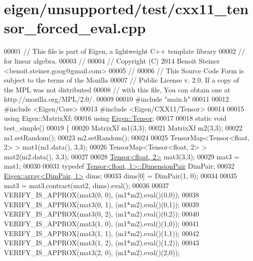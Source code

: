 \hypertarget{eigen_2unsupported_2test_2cxx11__tensor__forced__eval_8cpp_source}{}\section{eigen/unsupported/test/cxx11\+\_\+tensor\+\_\+forced\+\_\+eval.cpp}
\label{eigen_2unsupported_2test_2cxx11__tensor__forced__eval_8cpp_source}

\begin{DoxyCode}
00001 \textcolor{comment}{// This file is part of Eigen, a lightweight C++ template library}
00002 \textcolor{comment}{// for linear algebra.}
00003 \textcolor{comment}{//}
00004 \textcolor{comment}{// Copyright (C) 2014 Benoit Steiner <benoit.steiner.goog@gmail.com>}
00005 \textcolor{comment}{//}
00006 \textcolor{comment}{// This Source Code Form is subject to the terms of the Mozilla}
00007 \textcolor{comment}{// Public License v. 2.0. If a copy of the MPL was not distributed}
00008 \textcolor{comment}{// with this file, You can obtain one at http://mozilla.org/MPL/2.0/.}
00009 
00010 \textcolor{preprocessor}{#include "main.h"}
00011 
00012 \textcolor{preprocessor}{#include <Eigen/Core>}
00013 \textcolor{preprocessor}{#include <Eigen/CXX11/Tensor>}
00014 
00015 \textcolor{keyword}{using} Eigen::MatrixXf;
00016 \textcolor{keyword}{using} \hyperlink{class_eigen_1_1_tensor}{Eigen::Tensor};
00017 
00018 \textcolor{keyword}{static} \textcolor{keywordtype}{void} test\_simple()
00019 \{
00020   MatrixXf m1(3,3);
00021   MatrixXf m2(3,3);
00022   m1.setRandom();
00023   m2.setRandom();
00024 
00025   TensorMap<Tensor<float, 2> > mat1(m1.data(), 3,3);
00026   TensorMap<Tensor<float, 2> > mat2(m2.data(), 3,3);
00027 
00028   \hyperlink{class_eigen_1_1_tensor}{Tensor<float, 2>} mat3(3,3);
00029   mat3 = mat1;
00030 
00031   \textcolor{keyword}{typedef} \hyperlink{class_eigen_1_1_tensor}{Tensor<float, 1>::DimensionPair} DimPair;
00032   \hyperlink{class_eigen_1_1array}{Eigen::array<DimPair, 1>} dims;
00033   dims[0] = DimPair(1, 0);
00034 
00035   mat3 = mat3.contract(mat2, dims).eval();
00036 
00037   VERIFY\_IS\_APPROX(mat3(0, 0), (m1*m2).eval()(0,0));
00038   VERIFY\_IS\_APPROX(mat3(0, 1), (m1*m2).eval()(0,1));
00039   VERIFY\_IS\_APPROX(mat3(0, 2), (m1*m2).eval()(0,2));
00040   VERIFY\_IS\_APPROX(mat3(1, 0), (m1*m2).eval()(1,0));
00041   VERIFY\_IS\_APPROX(mat3(1, 1), (m1*m2).eval()(1,1));
00042   VERIFY\_IS\_APPROX(mat3(1, 2), (m1*m2).eval()(1,2));
00043   VERIFY\_IS\_APPROX(mat3(2, 0), (m1*m2).eval()(2,0));

\end{DoxyCode}
